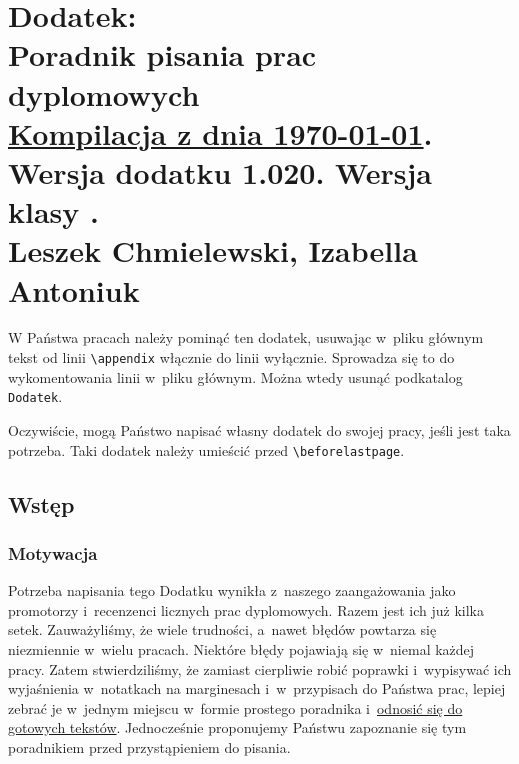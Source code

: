 \appendix

\newcommand{\SGGWappendixVersion}{1.020}

\newcommand{\kf}[1]{{\tt {\#{#1}}}}
\newcommand{\ky}[1]{\marginnote{\kf{#1}}}
\newcommand{\negat}[1]{{\color{red}\sout{#1}}}
\newcommand{\posit}[1]{{\color{blue}{#1}}}

\chapter[Dodatek: Poradnik pisania prac dyplomowych]{Dodatek:\\[-.3\baselineskip] Poradnik pisania prac dyplomowych\\[-.45\baselineskip]{\footnotesize\rm \hyperref[sec:dod:zmiany]{Kompilacja z dnia \today}. Wersja dodatku {\SGGWappendixVersion}. Wersja klasy {\SGGWthesisVersion}.} \\[-.35\baselineskip]\normalsize Leszek Chmielewski, Izabella Antoniuk}
\label{sec:dod:dodatek}

{\color{red}\footnotesize
{} \hspace{.2em} W Państwa pracach należy pominąć ten dodatek, usuwając w~pliku głównym tekst od linii \verb+\appendix+ włącznie do linii \verb++ wyłącznie. Sprowadza się to do wykomentowania linii  w~pliku głównym. Można wtedy usunąć podkatalog {\tt Dodatek}.

Oczywiście, mogą Państwo napisać własny dodatek do swojej pracy, jeśli jest taka potrzeba. Taki dodatek należy umieścić przed \verb|\beforelastpage|.}

\section{Wstęp}
\label{sec:dod:wstep}

\subsection{Motywacja}
\label{sec:dod:motywacja}

Potrzeba napisania tego Dodatku wynikła z~naszego zaangażowania jako promotorzy i~recenzenci licznych prac dyplomowych. Razem jest ich już kilka setek. Zauważyliśmy, że wiele trudności, a~nawet błędów powtarza się niezmiennie w~wielu pracach. Niektóre błędy pojawiają się w~niemal każdej pracy. Zatem stwierdziliśmy, że zamiast cierpliwie robić poprawki i~wypisywać ich wyjaśnienia w~notatkach na marginesach i~w~przypisach do Państwa prac, lepiej zebrać je w~jednym miejscu w~formie prostego poradnika i~\hyperref[sec:dod:klucze]{odnosić się do gotowych tekstów}. Jednocześnie proponujemy Państwu zapoznanie się tym poradnikiem przed przystąpieniem do pisania.

